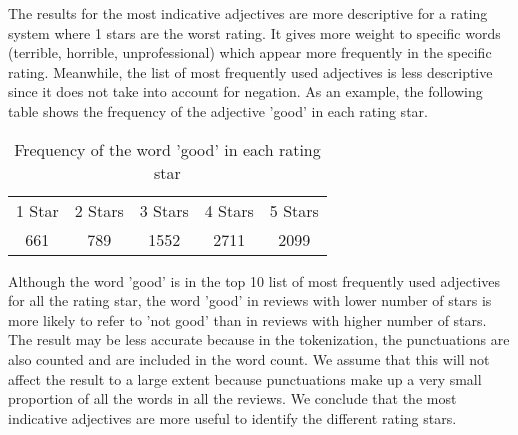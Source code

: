 The results for the most indicative adjectives are more descriptive for a rating system where 1 stars are the worst rating. It gives more weight to specific words (terrible, horrible, unprofessional) which appear more frequently in the specific rating. Meanwhile, the list of most frequently used adjectives is less descriptive since it does not take into account for negation. As an example, the following table shows the frequency of the adjective 'good' in each rating star.

    \begin{center}
        \begin{table}[!h]
        \caption{Frequency of the word 'good' in each rating star}
            \begin{tabular}{c c c c c}
                1 Star & 2 Stars & 3 Stars & 4 Stars & 5 Stars\\
                661 & 789 & 1552 & 2711 & 2099\\
            \end{tabular}
        \end{table}
    \end{center}
    
Although the word 'good' is in the top 10 list of most frequently used adjectives for all the rating star, the word 'good' in reviews with lower number of stars is more likely to refer to 'not good' than in reviews with higher number of stars. The result may be less accurate because in the tokenization, the punctuations are also counted and are included in the word count. We assume that this will not affect the result to a large extent because punctuations make up a very small proportion of all the words in all the reviews. We conclude that the most indicative adjectives are more useful to identify the different rating stars.